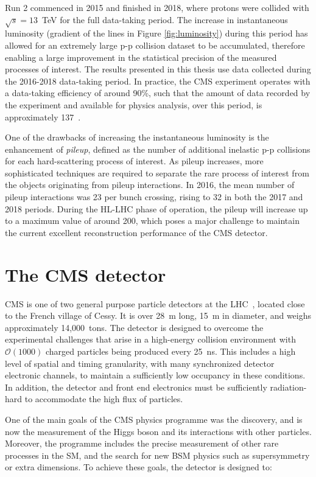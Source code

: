 Run 2 commenced in 2015 and finished in 2018, where protons were collided with $\sqrt{s}=13$~TeV for the full data-taking period. The increase in instantaneous luminosity (gradient of the lines in Figure \ref{fig:luminosity}) during this period has allowed for an extremely large p-p collision dataset to be accumulated, therefore enabling a large improvement in the statistical precision of the measured processes of interest. The results presented in this thesis use data collected during the 2016-2018 data-taking period. In practice, the CMS experiment operates with a data-taking efficiency of around 90\%, such that the amount of data recorded by the experiment and available for physics analysis, over this period, is approximately 137~\fbinv.

One of the drawbacks of increasing the instantaneous luminosity is the enhancement of \textit{pileup}, defined as the number of additional inelastic p-p collisions for each hard-scattering process of interest. As pileup increases, more sophisticated techniques are required to separate the rare process of interest from the objects originating from pileup interactions. In 2016, the mean number of pileup interactions was 23 per bunch crossing, rising to 32 in both the 2017 and 2018 periods. During the HL-LHC phase of operation, the pileup will increase up to a maximum value of around 200, which poses a major challenge to maintain the current excellent reconstruction performance of the CMS detector.

\section{The CMS detector}\label{sec:cms}
CMS is one of two general purpose particle detectors at the LHC~\cite{}, located close to the French village of Cessy. It is over 28~m long, 15~m in diameter, and weighs approximately 14,000~tons. The detector is designed to overcome the experimental challenges that arise in a high-energy collision environment with $\mathcal{O}(1000)$ charged particles being produced every 25~ns. This includes a high level of spatial and timing granularity, with many synchronized detector electronic channels, to maintain a sufficiently low occupancy in these conditions. In addition, the detector and front end electronics must be sufficiently radiation-hard to accommodate the high flux of particles.

One of the main goals of the CMS physics programme was the discovery, and is now the measurement of the Higgs boson and its interactions with other particles. Moreover, the programme includes the precise measurement of other rare processes in the SM, and the search for new BSM physics such as supersymmetry or extra dimensions. To achieve these goals, the detector is designed to:

